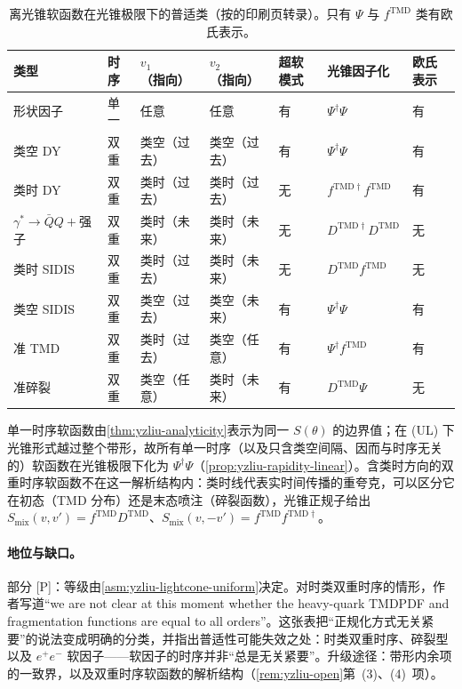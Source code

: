 \begin{table}[htbp]
\centering
\footnotesize
\renewcommand{\arraystretch}{1.08}
\begin{tabular}{@{}lllllll@{}}
\toprule
类型 & 时序 & $v_1$（指向） & $v_2$（指向） & 超软模式 & 光锥因子化 & 欧氏表示 \\
\midrule
形状因子 & 单一 & 任意 & 任意 & 有 & $\Psi^\dagger\Psi$ & 有 \\
类空 DY & 双重 & 类空（过去） & 类空（过去） & 有 & $\Psi^\dagger\Psi$ & 有 \\
类时 DY & 双重 & 类时（过去） & 类时（过去） & 无 & $f^{\mathrm{TMD}\dagger}f^{\mathrm{TMD}}$ & 有 \\
$\gamma^*\to\bar QQ+$强子 & 双重 & 类时（未来） & 类时（未来） & 无 & $D^{\mathrm{TMD}\dagger}D^{\mathrm{TMD}}$ & 无 \\
类时 SIDIS & 双重 & 类时（过去） & 类时（未来） & 无 & $D^{\mathrm{TMD}}f^{\mathrm{TMD}}$ & 无 \\
类空 SIDIS & 双重 & 类空（过去） & 类空（未来） & 有 & $\Psi^\dagger\Psi$ & 有 \\
准 TMD & 双重 & 类时（过去） & 类空（任意） & 有 & $\Psi^\dagger f^{\mathrm{TMD}}$ & 有 \\
准碎裂 & 双重 & 类空（任意） & 类时（未来） & 有 & $D^{\mathrm{TMD}}\Psi$ & 无 \\
\bottomrule
\end{tabular}
\caption{离光锥软函数在光锥极限下的普适类（按\cite[表~2]{Liu:2022nnk}的印刷页转录）。只有 $\Psi$ 与 $f^{\mathrm{TMD}}$ 类有欧氏表示。}
\label{tab:yzliu-classes}
\end{table}

\begin{proofsketch}
单一时序软函数由\cref{thm:yzliu-analyticity}表示为同一 $S(\theta)$ 的边界值；在 (UL) 下光锥形式越过整个带形，故所有单一时序（以及只含类空间隔、因而与时序无关的）软函数在光锥极限下化为 $\Psi^\dagger\Psi$（\cref{prop:yzliu-rapidity-linear}）。含类时方向的双重时序软函数不在这一解析结构内：类时线代表实时间传播的重夸克，可以区分它在初态（TMD 分布）还是末态喷注（碎裂函数），光锥正规子给出 $S_{\mathrm{mix}}(v,v')=f^{\mathrm{TMD}}D^{\mathrm{TMD}}$、$S_{\mathrm{mix}}(v,-v')=f^{\mathrm{TMD}}f^{\mathrm{TMD}\dagger}$\cite[第~4.6--4.7~节，式~(139)--(142)]{Liu:2022nnk}。
\end{proofsketch}

\paragraph{地位与缺口。}部分 [P]：等级由\cref{asm:yzliu-lightcone-uniform}决定。对时类双重时序的情形，作者写道“we are not clear at this moment whether the heavy-quark TMDPDF and fragmentation functions are equal to all orders”\cite[第~6~节]{Liu:2022nnk}。这张表把“正规化方式无关紧要”的说法变成明确的分类，并指出普适性可能失效之处：时类双重时序、碎裂型以及 $e^+e^-$ 软因子——软因子的时序并非“总是无关紧要”。升级途径：带形内余项的一致界，以及双重时序软函数的解析结构（\cref{rem:yzliu-open}第~(3)、(4)~项）。

